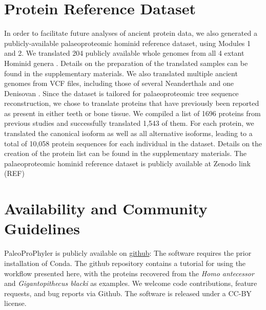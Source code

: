 \documentclass[twocolumn,showpacs,%
  nofootinbib,aps,superscriptaddress,%
  eqsecnum,prd,notitlepage,showkeys,10pt]{report}
\begin{document}
\section{Protein Reference Dataset}
In order to facilitate future analyses of ancient protein data, we also generated a publicly-available palaeoproteomic hominid reference dataset, using Modules 1 and 2. We translated 204 publicly available whole genomes from all 4 extant Hominid genera \cite{byrskahigh,prado2013great,nater2017morphometric}. Details on the preparation of the translated samples can be found in the supplementary materials. We also translated multiple ancient genomes from VCF files, including those of several Neanderthals and one Denisovan \cite{prufer2017high,mafessoni2020high}. Since the dataset is tailored for palaeoproteomic tree sequence reconstruction, we chose  to translate proteins that have previously been reported as present in either teeth or bone tissue. We compiled a list of 1696 proteins from previous studies \cite{castiblanco2015identification,alves2011unraveling,acil2005detection,salmon2016global,jagr2012comprehensive,park2009proteomics} and successfully translated 1,543 of them. For each protein, we translated the canonical isoform as well as all alternative isoforms, leading to a total of 10,058 protein sequences for each individual in the dataset. Details on the creation of the protein list can be found in the supplementary materials. The palaeoproteomic hominid reference dataset is publicly available at Zenodo link (REF)


\section{Availability and Community Guidelines}

PaleoProPhyler is publicly available on \href{https://github.com/johnpatramanis/Proteomic_Pipeline}{github}:
The software requires the prior installation of Conda. The github repository contains a tutorial for using the workflow presented here, with the proteins recovered from the \textit{Homo antecessor} and \textit{Gigantopithecus blacki} as examples. We welcome code contributions, feature requests, and bug reports via Github. The software is released under a CC-BY license.

\paragraph{}
\end{document}
